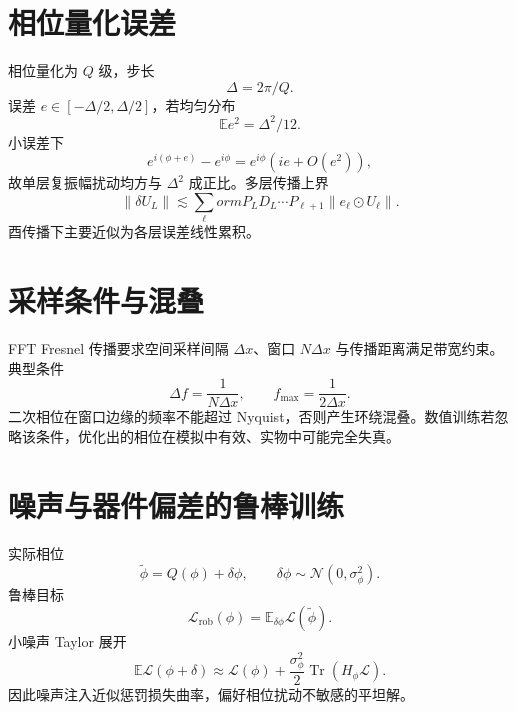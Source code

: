 \documentclass[UTF8,12pt,a4paper,fontset=none]{ctexart}
\numberwithin{equation}{section}
\newcommand{\E}{\mathbb{E}}
\newcommand{\Loss}{\mathcal{L}}
\newcommand{\norm}[1]{\left\lVert #1\right\rVert}
\newcommand{\tr}{\operatorname{Tr}}
\begin{document}
\section{相位量化误差}
相位量化为 $Q$ 级，步长
\begin{equation}
 \Delta=2\pi/Q.
\end{equation}
误差 $e\in[-\Delta/2,\Delta/2]$，若均匀分布
\begin{equation}
 \E e^2=\Delta^2/12.
\end{equation}
小误差下
\begin{equation}
 e^{i(\phi+e)}-e^{i\phi}
 =e^{i\phi}(ie+O(e^2)),
\end{equation}
故单层复振幅扰动均方与 $\Delta^2$ 成正比。多层传播上界
\begin{equation}
 \norm{\delta U_L}
 \lesssim\sum_{\ell}
orm{P_LD_L\cdots P_{\ell+1}}
 \norm{e_\ell\odot U_\ell}.
\end{equation}
酉传播下主要近似为各层误差线性累积。

\section{采样条件与混叠}
FFT Fresnel 传播要求空间采样间隔 $\Delta x$、窗口 $N\Delta x$ 与传播距离满足带宽约束。典型条件
\begin{equation}
 \Delta f=\frac1{N\Delta x},
 \qquad
 f_{\max}=\frac1{2\Delta x}.
\end{equation}
二次相位在窗口边缘的频率不能超过 Nyquist，否则产生环绕混叠。数值训练若忽略该条件，优化出的相位在模拟中有效、实物中可能完全失真。

\section{噪声与器件偏差的鲁棒训练}
实际相位
\begin{equation}
 \widetilde\phi=Q(\phi)+\delta\phi,
 \qquad \delta\phi\sim\mathcal N(0,\sigma_\phi^2).
\end{equation}
鲁棒目标
\begin{equation}
 \Loss_{\mathrm{rob}}(\phi)
 =\E_{\delta\phi}\Loss(\widetilde\phi).
\end{equation}
小噪声 Taylor 展开
\begin{equation}
 \E\Loss(\phi+\delta)
 \approx\Loss(\phi)+\frac{\sigma_\phi^2}{2}
 \tr(H_\phi\Loss).
\end{equation}
因此噪声注入近似惩罚损失曲率，偏好相位扰动不敏感的平坦解。
\clearpage
\end{document}
